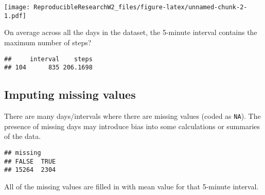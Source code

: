\documentclass[
]{article}
\newenvironment{Shaded}{\begin{snugshade}}{\end{snugshade}}
\newcommand{\CommentTok}[1]{\textcolor[rgb]{0.56,0.35,0.01}{\textit{#1}}}
\newcommand{\FunctionTok}[1]{\textcolor[rgb]{0.13,0.29,0.53}{\textbf{#1}}}
\newcommand{\NormalTok}[1]{#1}
\newcommand{\OtherTok}[1]{\textcolor[rgb]{0.56,0.35,0.01}{#1}}
\newcommand{\SpecialCharTok}[1]{\textcolor[rgb]{0.81,0.36,0.00}{\textbf{#1}}}
\begin{document}
\texttt{[image: ReproducibleResearchW2\_files/figure-latex/unnamed-chunk-2-1.pdf]}

On average across all the days in the dataset, the 5-minute interval
contains the maximum number of steps?

\begin{Shaded}
\end{Shaded}

\begin{verbatim}
##     interval    steps
## 104      835 206.1698
\end{verbatim}

\subsection{Imputing missing values}\label{imputing-missing-values}

There are many days/intervals where there are missing values (coded as
\texttt{NA}). The presence of missing days may introduce bias into some
calculations or summaries of the data.

\begin{Shaded}
\end{Shaded}

\begin{verbatim}
## missing
## FALSE  TRUE 
## 15264  2304
\end{verbatim}

All of the missing values are filled in with mean value for that
5-minute interval.
\end{document}
